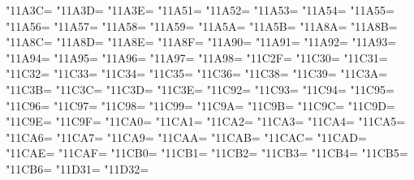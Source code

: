 \XeTeXcharclass"11A3C=\KclassCM
\XeTeXcharclass"11A3D=\KclassCM
\XeTeXcharclass"11A3E=\KclassCM
\XeTeXcharclass"11A51=\KclassCM
\XeTeXcharclass"11A52=\KclassCM
\XeTeXcharclass"11A53=\KclassCM
\XeTeXcharclass"11A54=\KclassCM
\XeTeXcharclass"11A55=\KclassCM
\XeTeXcharclass"11A56=\KclassCM
\XeTeXcharclass"11A57=\KclassCM
\XeTeXcharclass"11A58=\KclassCM
\XeTeXcharclass"11A59=\KclassCM
\XeTeXcharclass"11A5A=\KclassCM
\XeTeXcharclass"11A5B=\KclassCM
\XeTeXcharclass"11A8A=\KclassCM
\XeTeXcharclass"11A8B=\KclassCM
\XeTeXcharclass"11A8C=\KclassCM
\XeTeXcharclass"11A8D=\KclassCM
\XeTeXcharclass"11A8E=\KclassCM
\XeTeXcharclass"11A8F=\KclassCM
\XeTeXcharclass"11A90=\KclassCM
\XeTeXcharclass"11A91=\KclassCM
\XeTeXcharclass"11A92=\KclassCM
\XeTeXcharclass"11A93=\KclassCM
\XeTeXcharclass"11A94=\KclassCM
\XeTeXcharclass"11A95=\KclassCM
\XeTeXcharclass"11A96=\KclassCM
\XeTeXcharclass"11A97=\KclassCM
\XeTeXcharclass"11A98=\KclassCM
\XeTeXcharclass"11C2F=\KclassCM
\XeTeXcharclass"11C30=\KclassCM
\XeTeXcharclass"11C31=\KclassCM
\XeTeXcharclass"11C32=\KclassCM
\XeTeXcharclass"11C33=\KclassCM
\XeTeXcharclass"11C34=\KclassCM
\XeTeXcharclass"11C35=\KclassCM
\XeTeXcharclass"11C36=\KclassCM
\XeTeXcharclass"11C38=\KclassCM
\XeTeXcharclass"11C39=\KclassCM
\XeTeXcharclass"11C3A=\KclassCM
\XeTeXcharclass"11C3B=\KclassCM
\XeTeXcharclass"11C3C=\KclassCM
\XeTeXcharclass"11C3D=\KclassCM
\XeTeXcharclass"11C3E=\KclassCM
\XeTeXcharclass"11C92=\KclassCM
\XeTeXcharclass"11C93=\KclassCM
\XeTeXcharclass"11C94=\KclassCM
\XeTeXcharclass"11C95=\KclassCM
\XeTeXcharclass"11C96=\KclassCM
\XeTeXcharclass"11C97=\KclassCM
\XeTeXcharclass"11C98=\KclassCM
\XeTeXcharclass"11C99=\KclassCM
\XeTeXcharclass"11C9A=\KclassCM
\XeTeXcharclass"11C9B=\KclassCM
\XeTeXcharclass"11C9C=\KclassCM
\XeTeXcharclass"11C9D=\KclassCM
\XeTeXcharclass"11C9E=\KclassCM
\XeTeXcharclass"11C9F=\KclassCM
\XeTeXcharclass"11CA0=\KclassCM
\XeTeXcharclass"11CA1=\KclassCM
\XeTeXcharclass"11CA2=\KclassCM
\XeTeXcharclass"11CA3=\KclassCM
\XeTeXcharclass"11CA4=\KclassCM
\XeTeXcharclass"11CA5=\KclassCM
\XeTeXcharclass"11CA6=\KclassCM
\XeTeXcharclass"11CA7=\KclassCM
\XeTeXcharclass"11CA9=\KclassCM
\XeTeXcharclass"11CAA=\KclassCM
\XeTeXcharclass"11CAB=\KclassCM
\XeTeXcharclass"11CAC=\KclassCM
\XeTeXcharclass"11CAD=\KclassCM
\XeTeXcharclass"11CAE=\KclassCM
\XeTeXcharclass"11CAF=\KclassCM
\XeTeXcharclass"11CB0=\KclassCM
\XeTeXcharclass"11CB1=\KclassCM
\XeTeXcharclass"11CB2=\KclassCM
\XeTeXcharclass"11CB3=\KclassCM
\XeTeXcharclass"11CB4=\KclassCM
\XeTeXcharclass"11CB5=\KclassCM
\XeTeXcharclass"11CB6=\KclassCM
\XeTeXcharclass"11D31=\KclassCM
\XeTeXcharclass"11D32=\KclassCM
